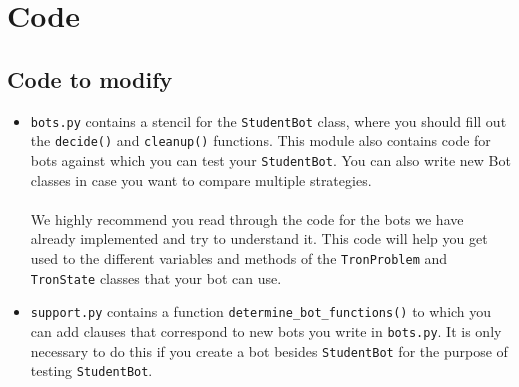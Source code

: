 \documentclass{article}
\begin{document}
\section{Code}
    \subsection{Code to modify}
    \begin{itemize}
        \item \texttt{bots.py} contains a stencil for the \texttt{StudentBot} class, where you should fill out the \texttt{decide()} and \texttt{cleanup()} functions.
        This module also contains code for bots against which you can test your \texttt{StudentBot}. You can also write new Bot classes in case you want to compare multiple strategies.
        \\ \\
        We highly recommend you read through the code for the bots we have already implemented and try to understand it. This code will help you get used to the different variables and methods of the \texttt{TronProblem} and \texttt{TronState} classes that your bot can use.

        \item \texttt{support.py} contains a function \texttt{determine\_bot\_functions()} to which you can add clauses that correspond to new bots you write in \texttt{bots.py}.
        It is only necessary to do this if you create a bot besides \texttt{StudentBot} for the purpose of testing \texttt{StudentBot}.
    \end{itemize}
\end{document}
